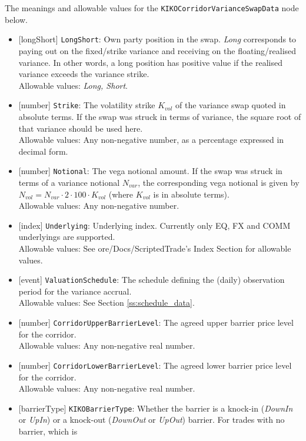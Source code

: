 The meanings and allowable values for the \lstinline!KIKOCorridorVarianceSwapData! node below.

\begin{itemize}
  \item{}[longShort] \lstinline!LongShort!: Own party position in the swap. \emph{Long} corresponds to paying out on the
  fixed/strike variance and receiving on the floating/realised variance. In other words, a long position has
  positive value if the realised variance exceeds the variance strike. \\
  Allowable values: \emph{Long, Short}.
  \item{}[number] \lstinline!Strike!: The volatility strike $K_{vol}$ of the variance swap quoted in absolute terms.
  If the swap was struck in terms of variance, the square root of that variance should be used here. \\
  Allowable values: Any non-negative number, as a percentage expressed in decimal form.
  \item{}[number] \lstinline!Notional!: The vega notional amount. If the swap was struck in terms of a variance notional
  $N_{var}$, the corresponding vega notional is given by $N_{vol} = N_{var} \cdot 2 \cdot 100 \cdot K_{vol}$ (where
  $K_{vol}$ is in absolute terms). \\
  Allowable values: Any non-negative number.
  \item{}[index] \lstinline!Underlying!: Underlying index. Currently only EQ, FX and COMM underlyings are supported. \\
  Allowable values: See ore/Docs/ScriptedTrade's Index Section for allowable values.
  \item{}[event] \lstinline!ValuationSchedule!: The schedule defining the (daily) observation period for the
  variance accrual. \\
  Allowable values: See Section \ref{ss:schedule_data}.
  \item{}[number] \lstinline!CorridorUpperBarrierLevel!: The agreed upper barrier price level for the corridor. \\
  Allowable values: Any non-negative real number.
  \item{}[number] \lstinline!CorridorLowerBarrierLevel!: The agreed lower barrier price level for the corridor. \\
  Allowable values: Any non-negative real number.
  \item{}[barrierType] \lstinline!KIKOBarrierType!: Whether the barrier is a knock-in (\emph{DownIn}
  or \emph{UpIn}) or a knock-out (\emph{DownOut} or \emph{UpOut}) barrier. For trades with no barrier, which is

\end{itemize}
